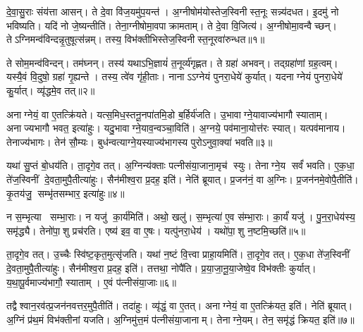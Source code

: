 \clearpage
{}
\setcounter{anuvakam}{0}

दे॒वा॒सु॒राः संय॑त्ता आसन्।
ते दे॒वा वि॑ज॒यमु॑प॒यन्त॑।
अ॒ग्नीषोम॑योस्तेज॒स्विनीस्त॒नूः सन्न्य॑दधत।
इ॒दमु॑ नो भविष्यति।
यदि॑ नो जे॒ष्यन्तीति॑।
तेना॒ग्नीषोमा॒वपाक्रामताम्।
ते दे॒वा वि॒जित्य॑।
अ॒ग्नीषोमा॒वन्वैच्छन्।
तेऽग्निमन्व॑\-विन्दन्नृ॒तुषूत्स॑न्नम्।
तस्य॒ विभ॑क्तीभिस्तेज॒स्विनीस्त॒नू\-रवा॑रुन्धत॥१॥

ते सोम॒मन्व॑विन्दन्।
तम॑घ्नन्।
तस्य॑ यथाऽभि॒ज्ञायं॑ त॒नूर्व्य॑गृह्णत।
ते ग्रहा॑ अभवन्।
तद्ग्रहा॑णां ग्रह॒त्वम्।
यस्यै॒वं वि॒दुषो॒ ग्रहा॑ गृ॒ह्यन्ते।
तस्य॒ त्वे॑व गृ॑ही॒ताः।
नानाऽऽग्नेयं पुनरा॒धेये॑ कुर्यात्।
यदनाग्नेयं पुनरा॒धेये॑ कु॒र्यात्।
व्यृ॑द्धमे॒व तत्॥२॥

अनाग्नेयं॒ वा ए॒तत्क्रि॑यते।
यत्स॒मिध॒स्तनू॒नपा॑तमि॒डो ब॒र्\mbox{}हिर्य॑जति।
उ॒भावाग्ने॒यावाज्य॑भागौ स्याताम्।
अनाज्यभागौ भवत॒ इत्या॑हुः।
यदु॒भावाग्ने॒याव॒न्वञ्चा॒विति॑।
अ॒ग्नये॒ पव॑माना॒योत्त॑रः स्यात्।
यत्पव॑मानाय।
तेनाज्य॑भागः।
तेन॑ सौ॒म्यः।
बुध॑न्वत्याग्ने॒यस्याज्य॑भागस्य पुरोऽनुवा॒क्या॑ भवति॥३॥

यथा॑ सु॒प्तं बो॒धय॑ति।
ता॒दृगे॒व तत्।
अ॒ग्निन्य॑क्ताः पत्नीसंया॒जाना॒मृच॑ स्युः।
तेनाग्ने॒य सर्वं॑ भवति।
ए॒क॒धा॒ ते॑ज॒स्विनीं दे॒वता॒मुपै॒तीत्या॑हुः।
सैन॑मीश्व॒रा प्र॒दह॒ इति॑।
नेति॑ ब्रूयात्।
प्र॒जन॑नं॒ वा अ॒ग्निः।
प्र॒जन॑नमे॒वोपै॒तीति॑।
कृ॒तय॑जु॒ सम्भृ॑तसम्भार॒ इत्या॑हुः॥४॥

न स॒म्भृत्या सम्भा॒राः।
न यजु॑ का॒र्य॑मिति॑।
अथो॒ खलु॑।
स॒म्भृत्या॑ ए॒व स॑म्भा॒राः।
का॒र्यं॑ यजु॑।
पु॒न॒रा॒धेय॑स्य॒ समृ॑द्ध्यै।
तेनो॑पा॒शु प्रच॑रति।
एष्य॑ इव॒ वा ए॒षः।
यत्पु॑नरा॒धेय॑।
यथो॑पा॒शु न॒ष्टमि॒च्छति॑॥५॥

ता॒दृगे॒व तत्।
उ॒च्चैः स्वि॑ष्ट॒कृत॒मुत्सृ॑जति।
यथा॑ न॒ष्टं वि॒त्त्वा प्राहा॒यमिति॑।
ता॒दृगे॒व तत्।
ए॒क॒धा ते॑ज॒स्विनीं दे॒वता॒मुपै॒तीत्या॑हुः।
सैन॑मीश्व॒रा प्र॒दह॒ इति॑।
तत्तथा॒ नोपै॑ति।
प्र॒या॒जा॒नू॒या॒जेष्वे॒व विभ॑क्तीः कुर्यात्।
य॒था॒पू॒र्वमाज्य॑भागौ॒ स्याताम्।
ए॒वं प॑त्नीसंया॒जाः॥६॥

तद्वैश्वान॒रव॑त्प्र॒जन॑नवत्तर॒मुपै॒तीति॑।
तदा॑हुः।
व्यृ॑द्धं॒ वा ए॒तत्।
अनाग्नेयं॒ वा ए॒तत्क्रि॑यत॒ इति॑।
नेति॑ ब्रूयात्।
अ॒ग्निं प्र॑थ॒मं विभ॑क्तीनां यजति।
अ॒ग्निमु॑त्त॒मं प॑त्नीसंया॒जानाम्।
तेनाग्ने॒यम्।
तेन॒ समृ॑द्धं क्रियत॒ इति॑॥७॥\anuvakamend[अ॒रु॒न्ध॒तै॒व तद्भ॑वति॒ सम्भृ॑तसम्भार॒ इत्या॑हुरि॒च्छति॑ पत्नीसंया॒जा नव॑ च]

